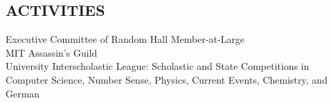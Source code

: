 \documentclass[margin]{res}
\begin{document}
\begin{resume}
\section{ACTIVITIES}             
        Executive Committee of Random Hall Member-at-Large \\
        MIT Assassin's Guild \\
        University Interscholastic League: Scholastic and State Competitions in
        Computer Science, Number Sense, Physics, Current Events, Chemistry, and German
 

\end{resume}
\end{document}
